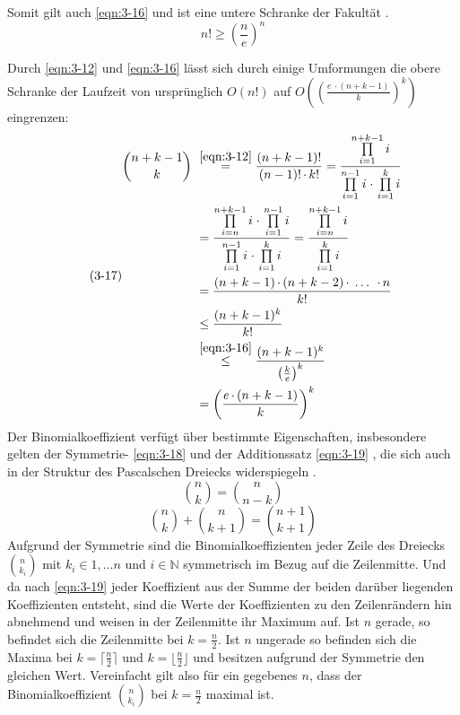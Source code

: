 Somit gilt auch \eqref{eqn:3-16} und ist eine untere Schranke der Fakultät \cite{script_binom}.
\begin{equation} \label{eqn:3-16}
\tag{3-16}
n! \geq \left( \frac{n}{e} \right) ^n 
\end{equation} 

Durch \eqref{eqn:3-12} und \eqref{eqn:3-16} lässt sich durch einige Umformungen die obere Schranke der Laufzeit von ursprünglich $ O(n!) $  auf $ O\left( \left( \frac{e \, \cdotp (n + k - 1)}{k}\right)^k\right) $ eingrenzen:
\begin{equation} \label{eqn:3-17}
\tag{3-17}
\begin{aligned}
\binom{n + k - 1}{k} &\ {} \overset{\eqref{eqn:3-12}}{=}  \frac{(n+k-1)!}{(n-1)!\, \cdotp k!} = \frac{\prod\limits_{i=1}^{n+k-1}i}{\prod\limits_{i=1}^{n-1}i \; \cdotp \, \prod\limits_{i=1}^{k}i}  \\
&\ = \frac{\prod\limits_{i=n}^{n+k-1}i \; \cdotp \, \prod\limits_{i=1}^{n-1}i}{\prod\limits_{i=1}^{n-1}i \; \cdotp \, \prod\limits_{i=1}^{k}i} = \frac{\prod\limits_{i=n}^{n+k-1}i}{\prod\limits_{i=1}^{k}i}\\
&\ = \frac{(n + k - 1) \, \cdotp (n + k - 2)\, \cdotp \; \dots \; \, \cdotp n}{k!} \\
&\ \leq \frac{(n + k - 1)^k}{k!} \\
&\ \overset{\eqref{eqn:3-16}}{\leq} \frac{(n + k - 1)^k}{\left( \frac{k}{e} \right) ^k} \\
&\ = \left( \frac{e \, \cdotp (n + k - 1)}{k}\right)^k  \\
\end{aligned}
\end{equation} 
Der Binomialkoeffizient verfügt über bestimmte Eigenschaften, insbesondere gelten der Symmetrie- \eqref{eqn:3-18} und der Additionssatz \eqref{eqn:3-19} , die sich auch in der Struktur des Pascalschen Dreiecks widerspiegeln \cite{bronst}. 
\begin{equation} \label{eqn:3-18}
\tag{3-18}
\binom{n}{k} = \binom{n}{n - k}
\end{equation} 
\begin{equation} \label{eqn:3-19}
\tag{3-19}
\binom{n}{k} + \binom{n}{k + 1} = \binom{n + 1}{k + 1} 
\end{equation} 
Aufgrund der Symmetrie sind die Binomialkoeffizienten jeder Zeile des Dreiecks $\binom{n}{k_{i}}$ mit $ k_{i} \in 1, \dots n $ und $ i \in \mathds{N} $ symmetrisch im Bezug auf die Zeilenmitte. Und da nach \eqref{eqn:3-19} jeder Koeffizient aus der Summe der beiden darüber liegenden Koeffizienten entsteht, sind die Werte der Koeffizienten zu den Zeilenrändern hin abnehmend und weisen in der Zeilenmitte ihr Maximum auf. Ist $n$ gerade, so befindet sich die Zeilenmitte bei $ k = \frac{n}{2} $. Ist $n$ ungerade so befinden sich die Maxima bei $ k = \lceil \frac{n}{2} \rceil $ und $ k = \lfloor \frac{n}{2} \rfloor $ und besitzen aufgrund der Symmetrie den gleichen Wert. Vereinfacht gilt also für ein gegebenes $n$, dass der Binomialkoeffizient $\binom{n}{k_{i}}$ bei $ k = \frac{n}{2} $ maximal ist. \\

